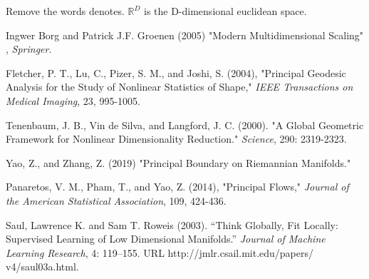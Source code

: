 \documentclass[12pt]{report}
\begin{document}
Remove the words denotes. $\mathbb{R}^D$ is the D-dimensional euclidean space. 



\begin{thebibliography}{9}

Ingwer Borg and Patrick J.F. Groenen (2005) "Modern Multidimensional Scaling"
, \textit{Springer}.

Fletcher, P. T., Lu, C., Pizer, S. M., and Joshi, S. (2004), "Principal Geodesic Analysis for the
Study of Nonlinear Statistics of Shape," 
\textit{IEEE Transactions on Medical Imaging}, 23, 995-1005.

Tenenbaum, J. B., Vin de Silva, and Langford, J. C. (2000). "A Global
Geometric Framework for Nonlinear Dimensionality Reduction." 
\textit{Science}, 290: 2319-2323.

Yao, Z., and Zhang, Z. (2019) "Principal Boundary on Riemannian Manifolds." 

Panaretos, V. M., Pham, T., and Yao, Z. (2014), 
"Principal Flows," \textit{Journal of the American
Statistical Association}, 109, 424-436.

Saul, Lawrence K. and Sam T. Roweis (2003). “Think Globally, Fit Locally:
Supervised Learning of Low Dimensional Manifolds.” \textit{Journal of Machine
Learning Research}, 4: 119–155. URL http://jmlr.csail.mit.edu/papers/
v4/saul03a.html.


\end{thebibliography}
\end{document}
